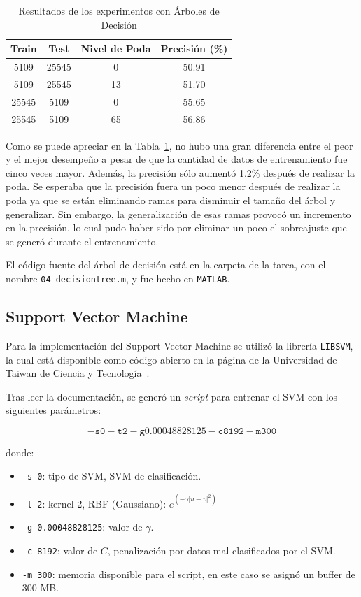 \documentclass{llncs}
\begin{document}
\begin{table}[htbp]
\centering
\caption{Resultados de los experimentos con Árboles de Decisión}
\label{tab:tree}
\begin{tabular}{@{}cccc@{}}
\toprule
Train & Test  & Nivel de Poda & Precisión (\%) \\ \midrule
5109  & 25545 & 0 & 50.91   \\
5109  & 25545 &  13 & 51.70   \\
25545 & 5109  & 0 & 55.65   \\
25545 & 5109  & 65 & 56.86   \\ \bottomrule
\end{tabular}
\end{table}

Como se puede apreciar en la Tabla~\ref{tab:tree}, no hubo una gran diferencia entre el peor y el mejor desempeño a pesar de que la cantidad de datos de entrenamiento fue cinco veces mayor.
Además, la precisión sólo aumentó 1.2\% después de realizar la poda.
Se esperaba que la precisión fuera un poco menor después de realizar la poda ya que se están eliminando ramas para disminuir el tamaño del árbol y generalizar.
Sin embargo, la generalización de esas ramas provocó un incremento en la precisión, lo cual pudo haber sido por eliminar un poco el sobreajuste que se generó durante el entrenamiento.

El código fuente del árbol de decisión está en la carpeta de la tarea, con el nombre \texttt{04-decisiontree.m}, y fue hecho en \texttt{MATLAB}.

\subsection{Support Vector Machine}
\label{subsec:svm}

Para la implementación del Support Vector Machine se utilizó la librería \texttt{LIBSVM}, la cual está disponible como código abierto en la página de la Universidad de Taiwan de Ciencia y Tecnología~\cite{LIBSVM}.

Tras leer la documentación, se generó un \textit{script} para entrenar el SVM con los siguientes parámetros:

$$\mathtt{-s 0 -t 2 -g 0.00048828125 -c 8192 -m 300}$$

donde:

\begin{itemize}
	\item \texttt{-s 0}: tipo de SVM, SVM de clasificación.
	\item \texttt{-t 2}: kernel 2, RBF (Gaussiano): $e^{(-\gamma |u-v|^2)}$
	\item \texttt{-g 0.00048828125}: valor de $\gamma$.
	\item \texttt{-c 8192}: valor de $C$, penalización por datos mal clasificados por el SVM.
	\item \texttt{-m 300}: memoria disponible para el script, en este caso se asignó un buffer de 300 MB.
\end{itemize}
\end{document}

